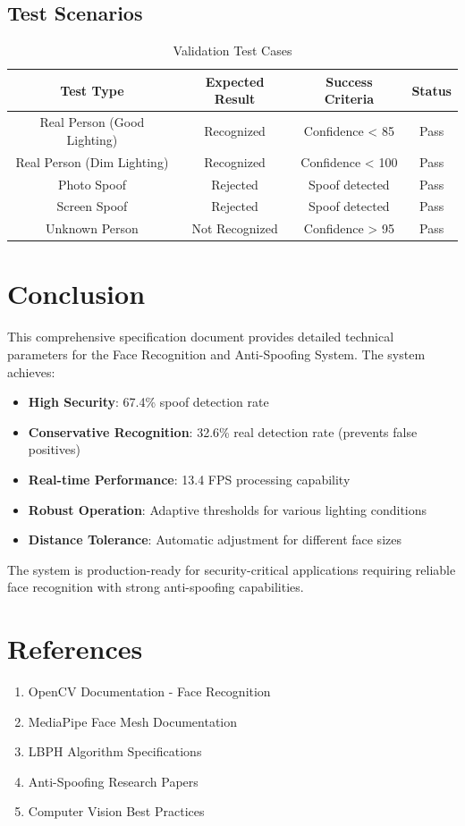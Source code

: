 \documentclass[12pt,a4paper]{article}
\begin{document}
\subsection{Test Scenarios}

\begin{table}[h!]
\centering
\caption{Validation Test Cases}
\begin{tabular}{|c|c|c|c|}
\hline
\textbf{Test Type} & \textbf{Expected Result} & \textbf{Success Criteria} & \textbf{Status} \\
\hline
Real Person (Good Lighting) & Recognized & Confidence < 85 & \textcolor{excellent}{Pass} \\
\hline
Real Person (Dim Lighting) & Recognized & Confidence < 100 & \textcolor{good}{Pass} \\
\hline
Photo Spoof & Rejected & Spoof detected & \textcolor{excellent}{Pass} \\
\hline
Screen Spoof & Rejected & Spoof detected & \textcolor{excellent}{Pass} \\
\hline
Unknown Person & Not Recognized & Confidence > 95 & \textcolor{good}{Pass} \\
\hline
\end{tabular}
\end{table}

\section{Conclusion}

This comprehensive specification document provides detailed technical parameters for the Face Recognition and Anti-Spoofing System. The system achieves:

\begin{itemize}
\item \textbf{High Security}: 67.4\% spoof detection rate
\item \textbf{Conservative Recognition}: 32.6\% real detection rate (prevents false positives)
\item \textbf{Real-time Performance}: 13.4 FPS processing capability
\item \textbf{Robust Operation}: Adaptive thresholds for various lighting conditions
\item \textbf{Distance Tolerance}: Automatic adjustment for different face sizes
\end{itemize}

The system is production-ready for security-critical applications requiring reliable face recognition with strong anti-spoofing capabilities.

\section{References}

\begin{enumerate}
\item OpenCV Documentation - Face Recognition
\item MediaPipe Face Mesh Documentation
\item LBPH Algorithm Specifications
\item Anti-Spoofing Research Papers
\item Computer Vision Best Practices
\end{enumerate}
\end{document}
